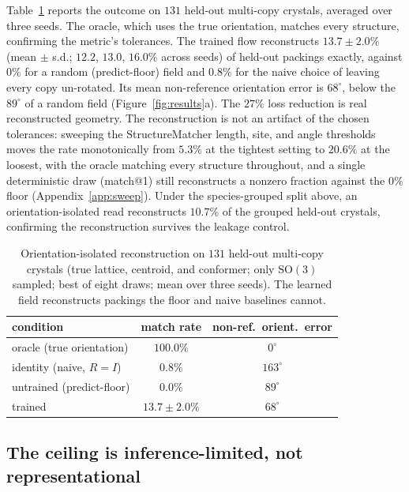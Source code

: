 \documentclass[10pt]{article}
\begin{document}
Table~\ref{tab:matchrate} reports the outcome on $131$ held-out multi-copy
crystals, averaged over three seeds. The oracle, which uses the true orientation,
matches every structure, confirming the metric's tolerances. The trained flow
reconstructs $13.7\pm2.0\%$ (mean $\pm$ s.d.; $12.2$, $13.0$, $16.0\%$ across
seeds) of held-out packings exactly, against $0\%$ for a random (predict-floor)
field and $0.8\%$ for the naive choice of leaving every copy un-rotated. Its mean
non-reference orientation error is $68^\circ$, below the $89^\circ$ of a random
field (Figure~\ref{fig:results}a). The $27\%$ loss reduction is real reconstructed
geometry. The reconstruction is not an artifact of the chosen tolerances:
sweeping the StructureMatcher length, site, and angle thresholds moves the rate
monotonically from $5.3\%$ at the tightest setting to $20.6\%$ at the loosest,
with the oracle matching every structure throughout, and a single deterministic
draw (match@1) still reconstructs a nonzero fraction against the $0\%$ floor
(Appendix~\ref{app:sweep}). Under the species-grouped split above, an
orientation-isolated read reconstructs $10.7\%$ of the grouped held-out crystals,
confirming the reconstruction survives the leakage control.

\begin{table}[t]
\centering
\caption{Orientation-isolated reconstruction on $131$ held-out multi-copy
crystals (true lattice, centroid, and conformer; only $\mathrm{SO}(3)$ sampled;
best of eight draws; mean over three seeds). The learned field reconstructs
packings the floor and naive baselines cannot.}
\label{tab:matchrate}
\begin{tabular}{lcc}
\toprule
condition & match rate & non-ref.\ orient.\ error \\
\midrule
oracle (true orientation) & $100.0\%$ & $0^\circ$ \\
identity (naive, $R=I$)   & $0.8\%$   & $163^\circ$ \\
untrained (predict-floor) & $0.0\%$   & $89^\circ$ \\
trained                   & $13.7\pm2.0\%$  & $68^\circ$ \\
\bottomrule
\end{tabular}
\end{table}

\subsection{The ceiling is inference-limited, not representational}
\end{document}
